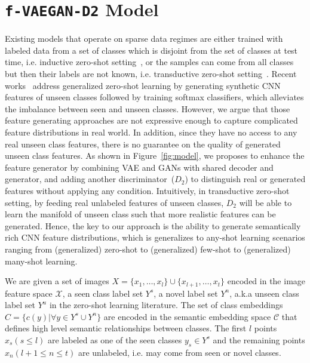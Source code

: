 \documentclass[10pt,twocolumn,letterpaper]{article}
\newcommand{\myparagraph}[1]{\vspace{5pt}\noindent{\bf #1}}
\begin{document}
\section{\texttt{f-VAEGAN-D2} Model}

Existing models that operate on sparse data regimes are either trained with labeled data from a set of classes which is disjoint from the set of classes at test time, i.e. inductive zero-shot setting~\cite{LNH13,FCSBDRM13}, or the samples can come from all classes but then their labels are not known, i.e. transductive zero-shot setting~\cite{FHXG15,MES13}. Recent works~\cite{XLSA18,Verma_2018_CVPR,FKRC18} address generalized zero-shot learning by generating synthetic CNN features of unseen classes followed by training softmax classifiers, which alleviates the imbalance between seen and unseen classes. However, we argue that those feature generating approaches are not expressive enough to capture complicated feature distributions in real world. In addition, since they have no access to any real unseen class features, there is no guarantee on the quality of generated unseen class features. As shown in Figure~\ref{fig:model}, we proposes to enhance the feature generator by combining VAE and GANs with shared decoder and generator, and adding another discriminator~($D_2$) to distinguish real or generated features without applying any condition. Intuitively, in transductive zero-shot setting, by feeding real unlabeled features of unseen classes, $D_2$ will be able to learn the manifold of unseen class such that more realistic features can be generated.
Hence, the key to our approach is the ability to generate semantically rich CNN feature distributions, which is generalizes to any-shot learning scenarios ranging from (generalized) zero-shot to (generalized) few-shot to (generalized) many-shot learning.

\myparagraph{Setup.}
We are given a set of images $X=\{x_1,\ldots,x_l\} \cup \{x_{l+1},\ldots,x_t \}$ encoded in the image feature space $\mathcal{X}$, a seen class label set $Y^s$, a novel label set $Y^n$, a.k.a unseen class label set $Y^u$ in the zero-shot learning literature. The set of class embeddings  $C=\{c(y)| \forall y \in Y^s \cup Y^n\}$ are encoded in the semantic embedding space $\mathcal{C}$ that defines high level semantic relationships between classes. The first $l$ points $x_s(s\leq l)$ are labeled as one of the seen classes $y_s\in Y^s$ and the remaining points $x_n(l+1\leq n \leq t)$ are unlabeled, i.e. may come from seen or novel classes. 
\end{document}
